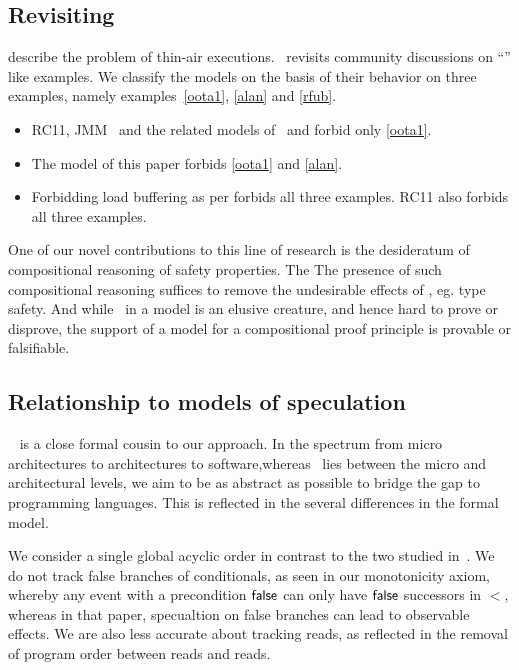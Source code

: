 \subsection{Revisiting \oota}
\citet{DBLP:conf/esop/BattyMNPS15} describe the problem of thin-air executions.~\citet{BoehmOOTA} revisits community discussions on ``\oota'' like examples.  We classify the models on the basis of their behavior on three examples, namely examples~\eqref{oota1}, \eqref{alan} and \eqref{rfub}.  
\begin{itemize}
\item RC11\cite{DBLP:conf/pldi/LahavVKHD17}, JMM~\cite{Manson:2005:JMM:1047659.1040336} and the related models of~\citet{DBLP:conf/esop/JagadeesanPR10} and \citet{DBLP:conf/popl/KangHLVD17} forbid only \eqref{oota1}.
\item The model of this paper forbids \eqref{oota1} and \eqref{alan}.
\item Forbidding load buffering as per \citep{Dolan:2018:BDR:3192366.3192421,BoehmOOTA} forbids all three examples.  RC11\cite{DBLP:conf/pldi/LahavVKHD17} also forbids all three examples. 
\end{itemize}

One of our novel contributions to this line of research is the desideratum of compositional reasoning of safety properties. The The presence of such compositional reasoning suffices to remove the undesirable effects of \oota, eg. type safety.  And while \oota\ in a model is an elusive creature, and hence hard to prove or disprove,  the support of a model for a compositional proof principle is provable or falsifiable.  

\subsection{Relationship to models of speculation}
 ~\citet{2019-sp} is a close formal cousin to our approach.   In the spectrum from micro architectures to architectures to software,whereas~\citet{2019-sp} lies between the micro and architectural levels, we aim to be as abstract as possible to bridge the gap to programming languages.  This is reflected in the several differences in the formal model.  

We consider a single global acyclic order in contrast to the two studied in~\citet{2019-sp}.  We do not track false branches of conditionals, as seen in our monotonicity axiom, whereby any event with a precondition $\mathsf{false}$ can only have $\mathsf{false}$ successors in $\lt$, whereas in that paper, specualtion on false branches can lead to observable effects.   We are also less accurate  about tracking reads, as reflected in the removal of program order between reads and reads.   

